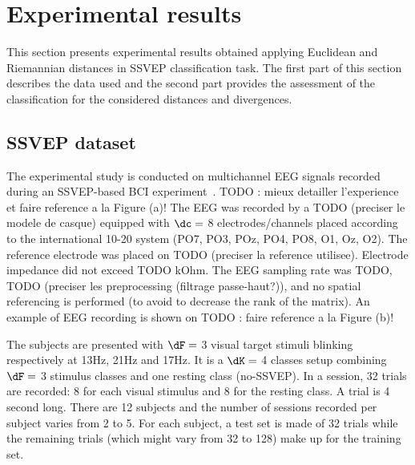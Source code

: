 \section{Experimental results}
\label{sec:expresults}
This section presents experimental results obtained applying Euclidean and Riemannian distances in SSVEP classification task. 
The first part of this section describes the data used and the second part provides the assessment of the classification for the considered distances and divergences. %

\subsection{SSVEP dataset}
The experimental study is conducted on multichannel EEG signals recorded during an SSVEP-based BCI experiment~\cite{kalunga_hybrid_2014}. TODO : mieux detailler l'experience et faire reference a la Figure (a)!
The EEG was recorded by a TODO (preciser le modele de casque) equipped with $\dc=$ 8 electrodes/channels placed according to the international 10-20 system (PO7, PO3, POz, PO4, PO8, O1, Oz, O2). The reference electrode was placed on TODO (preciser la reference utilisee). Electrode impedance did not exceed TODO kOhm. The EEG sampling rate was TODO, TODO (preciser les preprocessing (filtrage passe-haut?)), and no spatial referencing is performed (to avoid to decrease the rank of the matrix). An example of EEG recording is shown on TODO : faire reference a la Figure (b)!

The subjects are presented with $\dF=$ 3 visual target stimuli blinking respectively at 13Hz, 21Hz and 17Hz.
It is a $\dK=$ 4 classes setup combining $\dF=$ 3 stimulus classes and one resting class (no-SSVEP).
In a session, 32 trials are recorded: 8 for each visual stimulus and 8 for the resting class. 
A trial is 4 second long. 
There are 12 subjects and the number of sessions recorded per subject varies from 2 to 5.
For each subject, a test set is made of 32 trials while the remaining trials (which might vary from 32 to 128) make up for the training set.
